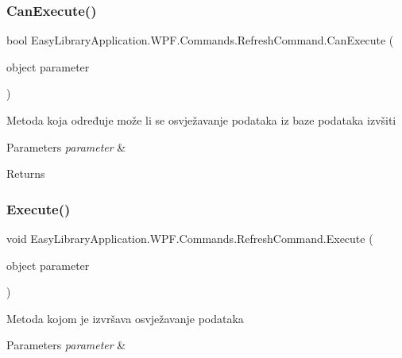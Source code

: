 \subsubsection{\texorpdfstring{Can\+Execute()}{CanExecute()}}
{\footnotesize\ttfamily bool Easy\+Library\+Application.\+W\+P\+F.\+Commands.\+Refresh\+Command.\+Can\+Execute (\begin{DoxyParamCaption}\item[{object}]{parameter }\end{DoxyParamCaption})}



Metoda koja određuje može li se osvježavanje podataka iz baze podataka izvšiti 


\begin{DoxyParams}{Parameters}
{\em parameter} & \\
\hline
\end{DoxyParams}
\begin{DoxyReturn}{Returns}

\end{DoxyReturn}
\mbox{\label{class_easy_library_application_1_1_w_p_f_1_1_commands_1_1_refresh_command_a09898c4475ff4676b330da32d5a01c8f}} 
\subsubsection{\texorpdfstring{Execute()}{Execute()}}
{\footnotesize\ttfamily void Easy\+Library\+Application.\+W\+P\+F.\+Commands.\+Refresh\+Command.\+Execute (\begin{DoxyParamCaption}\item[{object}]{parameter }\end{DoxyParamCaption})}



Metoda kojom je izvršava osvježavanje podataka 


\begin{DoxyParams}{Parameters}
{\em parameter} & \\
\hline
\end{DoxyParams}


